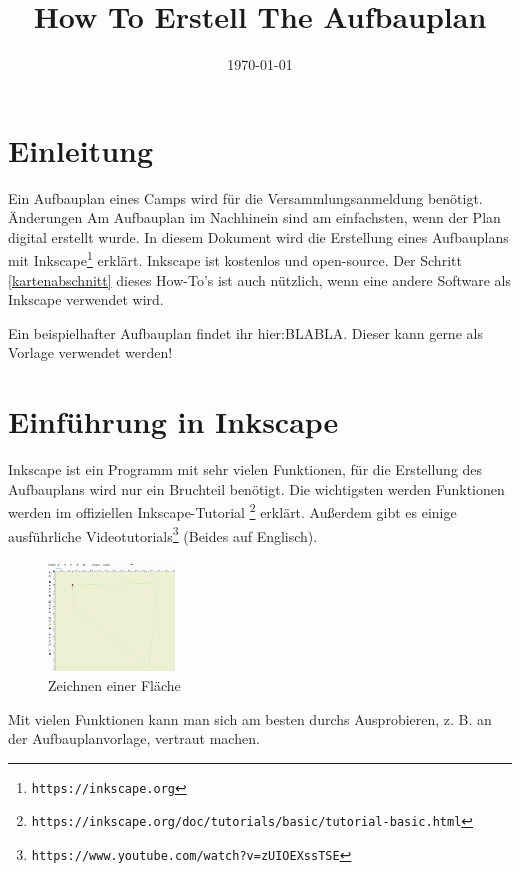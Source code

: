\documentclass[letterpaper,12pt,
				parkskip = half]{article}
\begin{document}
\title{How To Erstell The Aufbauplan}
\date{\today}
\maketitle


\section{Einleitung}

Ein Aufbauplan eines Camps wird für die Versammlungsanmeldung benötigt. Änderungen Am Aufbauplan im Nachhinein sind am einfachsten, wenn der Plan digital erstellt wurde. In diesem Dokument wird die Erstellung eines Aufbauplans mit Inkscape\footnote{\texttt{https://inkscape.org}} erklärt. Inkscape ist kostenlos und open-source. Der Schritt \ref{kartenabschnitt} dieses How-To's ist auch nützlich, wenn eine andere Software als Inkscape verwendet wird.


Ein beispielhafter Aufbauplan findet ihr hier:BLABLA. Dieser kann gerne als Vorlage verwendet werden!

\section{Einführung in Inkscape}

Inkscape ist ein Programm mit sehr vielen Funktionen, für die Erstellung des Aufbauplans wird nur ein Bruchteil benötigt. Die wichtigsten werden Funktionen werden im offiziellen Inkscape-Tutorial \footnote{\texttt{https://inkscape.org/doc/tutorials/basic/tutorial-basic.html}} erklärt. Außerdem gibt es einige ausführliche Videotutorials\footnote{\texttt{https://www.youtube.com/watch?v=zUIOEXssTSE}} (Beides auf Englisch).

\begin{figure}
	\includegraphics[width=0.3\textwidth]{Images/area.png}
	\caption{Zeichnen einer Fläche}
	\label{fig:area}
\end{figure}

Mit vielen Funktionen kann man sich am besten durchs Ausprobieren, z. B. an der Aufbauplanvorlage, vertraut machen.
\end{document}
